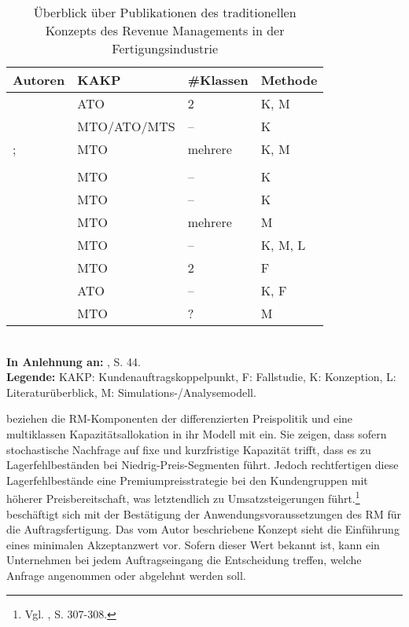 \begin{table}[h!]
  \begin{center}
    \caption{Überblick über Publikationen des traditionellen Konzepts des Revenue Managements in der Fertigungsindustrie}  \label{Überblick}
    \vspace*{3mm}
    \begin{tabular}{llll}   %
     Autoren & KAKP  & \#Klassen & Methode  \\ \hline
     \cite{deBHarris1995299} &      ATO          &  2  &  K, M \\
      \cite{Kalyan:2002aa}      &      MTO/ATO/MTS          &  --  &  K \\
                \cite{rehkopf:2005aa};   &      MTO          &  mehrere &  K, M \\
                               \cite{Spengler:2007aa}   &                &  &   \\
          \cite{kimms2005branchenverg} & MTO & -- & K \\
          \cite{kolisch2006revenue} & MTO & -- & K \\
              \cite{DECI:DECI074}  &      MTO          &  mehrere  &  M \\
      \cite{rehkopf2007revenue}    &      MTO          &  --  &  K, M, L \\
          \cite{kuhn2004revenue} & MTO & 2 & F \\
        \cite{Specht:2008aa} &        ATO    &  --  & K, F  \\    
          \cite{petrick2012using}      &      MTO          &  ?  &  M \\\hline
    \end{tabular} \\[3mm]
    {\footnotesize \textbf{In Anlehnung an:} \cite{quante2009management}, S. 44.}\\
        {\footnotesize \textbf{Legende:} KAKP: Kundenauftragskoppelpunkt, F: Fallstudie, K: Konzeption, L: Literaturüberblick, M: Simulations-/Analysemodell. }   %
  \end{center}
\end{table}

\cite{deBHarris1995299} beziehen die RM-Komponenten der differenzierten Preispolitik und eine multiklassen Kapazitätsallokation in ihr Modell mit ein. Sie zeigen, dass sofern stochastische Nachfrage auf fixe und kurzfristige Kapazität trifft, dass es zu Lagerfehlbeständen bei Niedrig-Preis-Segmenten führt. Jedoch rechtfertigen diese Lagerfehlbestände eine Premiumpreisstrategie bei den Kundengruppen mit höherer Preisbereitschaft, was letztendlich zu Umsatzsteigerungen führt.\footnote{Vgl. \cite{deBHarris1995299}, S. 307-308.} \cite{Kalyan:2002aa} beschäftigt sich mit der Bestätigung der Anwendungsvoraussetzungen des RM für die Auftragsfertigung. Das vom Autor beschriebene Konzept sieht die Einführung eines minimalen Akzeptanzwert vor. Sofern dieser Wert bekannt ist, kann ein Unternehmen bei jedem Auftragseingang die Entscheidung treffen, welche Anfrage angenommen oder abgelehnt werden soll.

